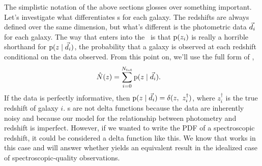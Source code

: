 The simplistic notation of the above sections glosses over something important.
Let's investigate what differentiates \pzpdf s for each galaxy.
The redshifts are always defined over the same dimension, but what's different is the photometric data $\vec{d}_{i}$ for each galaxy.
The way that enters into the \pzpdf\ is that $\mathrm{p}(z_{i})$ is really a horrible shorthand for $\mathrm{p}(z \mid \vec{d}_{i})$, the probability that a galaxy is observed at each redshift conditional on the data  observed.
From this point on, we'll use the full form of ,
\begin{align}
\eqlabel{eqn:stackwithdata}
\hat{N}(z) &= \sum_{i = 0}^{\ntot} \pr{z \gvn \data_{i}} .
\end{align}
If the data is perfectly informative, then $\pr{z \gvn \data_{i}} = \delta(z,\ z_{i}^{\dagger})$, where $z_{i}^{\dagger}$ is the true redshift of galaxy $i$.
\Pzpdf s are not delta functions because the data are inherently noisy and because our model for the relationship between photometry and redshift is imperfect.
However, if we wanted to write the PDF of a spectroscopic redshift, it could be considered a delta function like this.
We know that  works in this case and will answer whether  yields an equivalent result in the idealized case of spectroscopic-quality observations.

